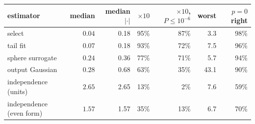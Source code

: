 \begin{tabular}{lrrrrrr}
\toprule
estimator & median & median $|\cdot|$ & $\times10$ & $\times10$, $P\leq10^{-6}$ & worst & $p=0$ right\\
\midrule
select & $0.04$ & 0.18 & 95\% & 87\% & 3.3 & 98\%\\
tail fit & $0.07$ & 0.18 & 93\% & 72\% & 7.5 & 96\%\\
sphere surrogate & $0.24$ & 0.36 & 77\% & 71\% & 5.7 & 94\%\\
output Gaussian & $0.28$ & 0.68 & 63\% & 35\% & 43.1 & 90\%\\
independence (units) & $2.65$ & 2.65 & 13\% & 2\% & 7.6 & 59\%\\
independence (even form) & $1.57$ & 1.57 & 35\% & 13\% & 6.7 & 70\%\\
\bottomrule
\end{tabular}
